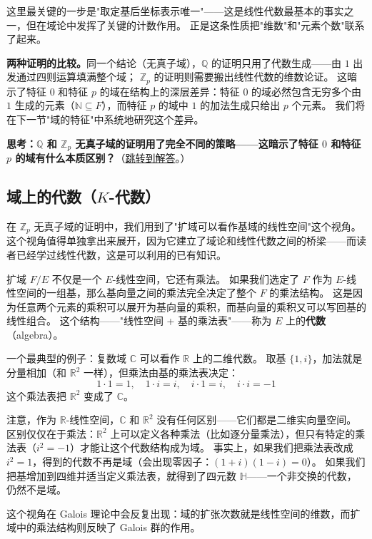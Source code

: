 这里最关键的一步是"取定基后坐标表示唯一"——这是线性代数最基本的事实之一，但在域论中发挥了关键的计数作用。
正是这条性质把"维数"和"元素个数"联系了起来。

\textbf{两种证明的比较。}同一个结论（无真子域），$\mathbb{Q}$ 的证明只用了代数生成——由 $1$ 出发通过四则运算填满整个域；
$\mathbb{Z}_p$ 的证明则需要搬出线性代数的维数论证。
这暗示了特征 $0$ 和特征 $p$ 的域在结构上的深层差异：特征 $0$ 的域必然包含无穷多个由 $1$ 生成的元素（$\mathbb{N} \subseteq F$），而特征 $p$ 的域中 $1$ 的加法生成只给出 $p$ 个元素。
我们将在下一节"域的特征"中系统地研究这个差异。

\hypertarget{q:q-zp-no-proper-subfield}{}
\medskip
\noindent\textbf{思考：$\mathbb{Q}$ 和 $\mathbb{Z}_p$ 无真子域的证明用了完全不同的策略——这暗示了特征 $0$ 和特征 $p$ 的域有什么本质区别？}（\hyperlink{ans:q-zp-no-proper-subfield}{跳转到解答}。）
\medskip

\subsection{域上的代数（$K$-代数）}

在 $\mathbb{Z}_p$ 无真子域的证明中，我们用到了"扩域可以看作基域的线性空间"这个视角。
这个视角值得单独拿出来展开，因为它建立了域论和线性代数之间的桥梁——而读者已经学过线性代数，这是可以利用的已有知识。

扩域 $F/E$ 不仅是一个 $E$-线性空间，它还有乘法。
如果我们选定了 $F$ 作为 $E$-线性空间的一组基，那么基向量之间的乘法完全决定了整个 $F$ 的乘法结构。
这是因为任意两个元素的乘积可以展开为基向量的乘积，而基向量的乘积又可以写回基的线性组合。
这个结构——"线性空间 + 基的乘法表"——称为 $E$ 上的\textbf{代数}（algebra）。

一个最典型的例子：复数域 $\mathbb{C}$ 可以看作 $\mathbb{R}$ 上的二维代数。
取基 $\{1, i\}$，加法就是分量相加（和 $\mathbb{R}^2$ 一样），但乘法由基的乘法表决定：
\[
1 \cdot 1 = 1, \quad 1 \cdot i = i, \quad i \cdot 1 = i, \quad i \cdot i = -1
\]
这个乘法表把 $\mathbb{R}^2$ 变成了 $\mathbb{C}$。

注意，作为 $\mathbb{R}$-线性空间，$\mathbb{C}$ 和 $\mathbb{R}^2$ 没有任何区别——它们都是二维实向量空间。
区别仅仅在于乘法：$\mathbb{R}^2$ 上可以定义各种乘法（比如逐分量乘法），但只有特定的乘法表（$i^2 = -1$）才能让这个代数结构成为域。
事实上，如果我们把乘法表改成 $i^2 = 1$，得到的代数不再是域（会出现零因子：$(1+i)(1-i) = 0$）。
如果我们把基增加到四维并适当定义乘法表，就得到了四元数 $\mathbb{H}$——一个非交换的代数，仍然不是域。

这个视角在 Galois 理论中会反复出现：域的扩张次数就是线性空间的维数，而扩域中的乘法结构则反映了 Galois 群的作用。

